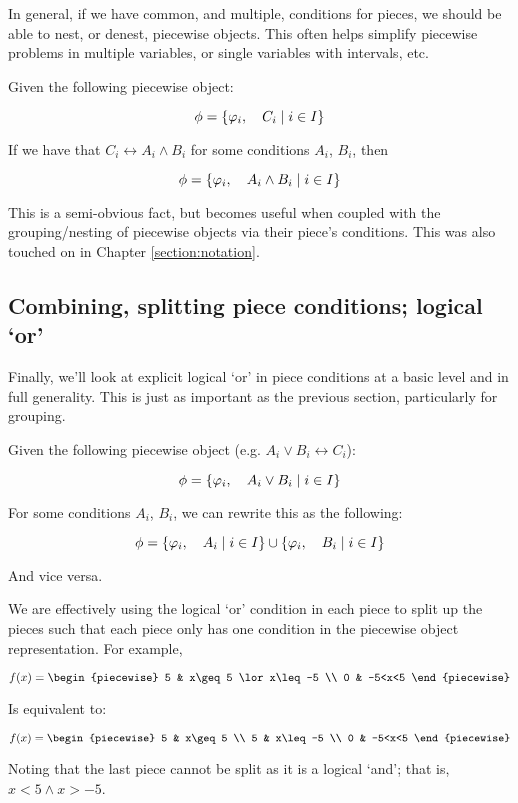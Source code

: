In general, if we have common, and multiple, conditions for pieces, we should be able to nest, or denest, piecewise objects. This often helps simplify piecewise problems in multiple variables, or single variables with intervals, etc.

\begin{theorem}
    Given the following piecewise object:

    $$
        \phi=\{\varphi_i,\quad C_i\mid i\in I\}
    $$

    If we have that $C_i\leftrightarrow A_i\land B_i$ for some conditions $A_i$, $B_i$, then

    $$
        \phi=\{\varphi_i,\quad A_i\land B_i\mid i\in I\}
    $$

    This is a semi-obvious fact, but becomes useful when coupled with the grouping/nesting of piecewise objects via their piece's conditions. This was also touched on in Chapter \ref{section:notation}.
\end{theorem}
\subsection{Combining, splitting piece conditions; logical `or'}
Finally, we'll look at explicit logical `or' in piece conditions at a basic level and in full generality. This is just as important as the previous section, particularly for grouping.

\begin{theorem}
    Given the following piecewise object (e.g. $A_i\lor B_i\leftrightarrow C_i$):

    $$
        \phi=\{\varphi_i,\quad A_i\lor B_i\mid i\in I\}
    $$

    For some conditions $A_i$, $B_i$, we can rewrite this as the following:

    $$
        \phi=\{\varphi_i,\quad A_i\mid i\in I\}\cup\{\varphi_i,\quad B_i\mid i\in I\}
    $$

    And vice versa.

    We are effectively using the logical `or' condition in each piece to split up the pieces such that each piece only has one condition in the piecewise object representation. For example,

    $$
        f(x) = \begin{piecewise}
            5 & x\geq 5 \lor x\leq -5 \\
            0 & -5<x<5
        \end{piecewise}
    $$

    Is equivalent to:

    $$
        f(x) = \begin{piecewise}
            5 & x\geq 5 \\
            5 & x\leq -5 \\
            0 & -5<x<5
        \end{piecewise}
    $$

    Noting that the last piece cannot be split as it is a logical `and'; that is, $x<5\land x>-5$.
\end{theorem}

